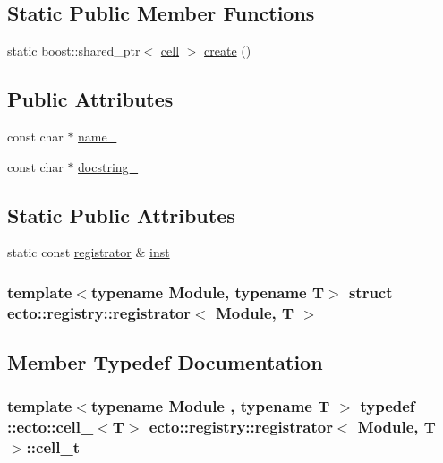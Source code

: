 \subsection*{\-Static \-Public \-Member \-Functions}
\begin{DoxyCompactItemize}
\item 
static boost\-::shared\-\_\-ptr$<$ \hyperlink{structecto_1_1cell}{cell} $>$ \hyperlink{structecto_1_1registry_1_1registrator_aa46347f24e15fcc5955523d5e2adadf7}{create} ()
\end{DoxyCompactItemize}
\subsection*{\-Public \-Attributes}
\begin{DoxyCompactItemize}
\item 
const char $\ast$ \hyperlink{structecto_1_1registry_1_1registrator_a794acc964cefc0a374129823b4ee5246}{name\-\_\-}
\item 
const char $\ast$ \hyperlink{structecto_1_1registry_1_1registrator_a6eb361c892595a3d71ab627829c07bdb}{docstring\-\_\-}
\end{DoxyCompactItemize}
\subsection*{\-Static \-Public \-Attributes}
\begin{DoxyCompactItemize}
\item 
static const \hyperlink{structecto_1_1registry_1_1registrator}{registrator} \& \hyperlink{structecto_1_1registry_1_1registrator_a0b0f6e3aa1718476b962a007786e7496}{inst}
\end{DoxyCompactItemize}
\subsubsection*{template$<$typename Module, typename T$>$ struct ecto\-::registry\-::registrator$<$ Module, T $>$}



\subsection{\-Member \-Typedef \-Documentation}
\hypertarget{structecto_1_1registry_1_1registrator_ae352ebfb18c87dc7fb3f649ecbe445fa}{
\subsubsection[{cell\-\_\-t}]{\setlength{\rightskip}{0pt plus 5cm}template$<$typename Module , typename T $>$ typedef \-::{\bf ecto\-::cell\-\_\-}$<$\-T$>$ {\bf ecto\-::registry\-::registrator}$<$ \-Module, \-T $>$\-::{\bf cell\-\_\-t}}}\label{structecto_1_1registry_1_1registrator_ae352ebfb18c87dc7fb3f649ecbe445fa}


